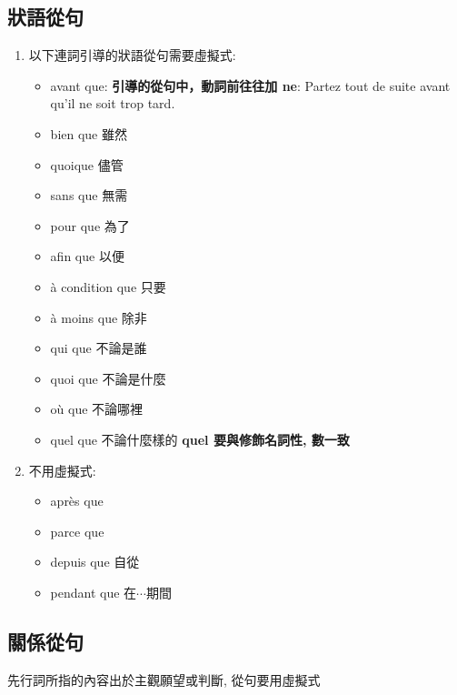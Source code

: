 \documentclass{book}
\begin{document}
        \subsection{狀語從句}
            \begin{enumerate}
                \item 以下連詞引導的狀語從句需要虛擬式:
                    \begin{itemize}
                        \item avant que: \textbf{引導的從句中，動詞前往往加 ne}: Partez tout de suite avant qu'il ne soit trop tard.
                        \item bien que 雖然
                        \item quoique 儘管
                        \item sans que 無需
                        \item pour que 為了
                        \item afin que 以便
                        \item à condition que 只要
                        \item à moins que 除非
                        \item qui que 不論是誰
                        \item quoi que 不論是什麼
                        \item où que 不論哪裡
                        \item quel que 不論什麼樣的 \textbf{quel 要與修飾名詞性, 數一致} 
                    \end{itemize}
                \item 不用虛擬式:
                    \begin{itemize}
                        \item après que
                        \item parce que
                        \item depuis que 自從
                        \item pendant que 在$\cdots$期間
                    \end{itemize}
            \end{enumerate}
        
        \subsection{關係從句}
            先行詞所指的內容出於主觀願望或判斷, 從句要用虛擬式
    
\end{document}
